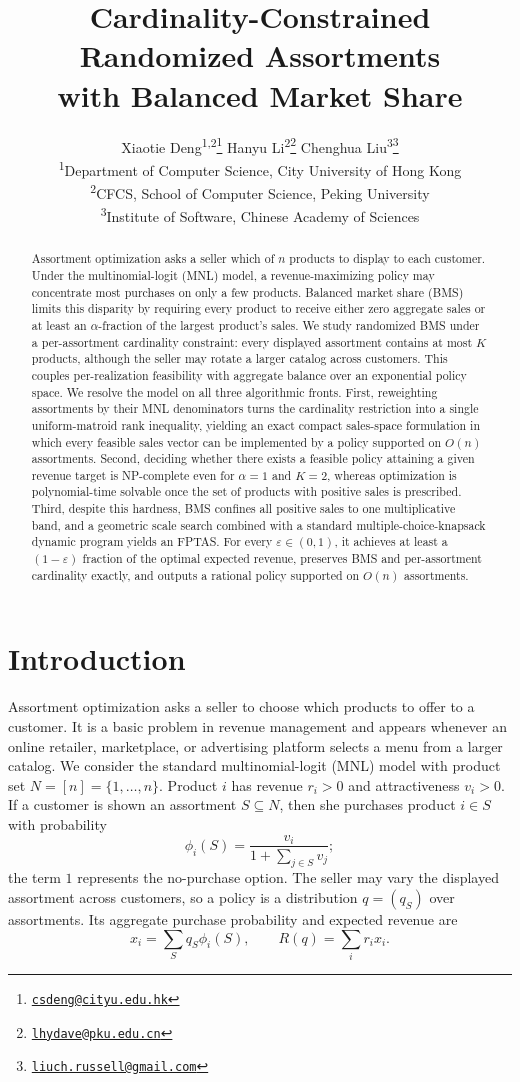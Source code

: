\documentclass[11pt]{article}
\title{Cardinality-Constrained Randomized Assortments\\with Balanced Market Share}
\author{Xiaotie Deng\textsuperscript{1,2}\thanks{\href{mailto:csdeng@cityu.edu.hk}{\texttt{csdeng@cityu.edu.hk}}}\quad
Hanyu Li\textsuperscript{2}\thanks{\href{mailto:lhydave@pku.edu.cn}{\texttt{lhydave@pku.edu.cn}}}\quad
Chenghua Liu\textsuperscript{3}\thanks{\href{mailto:liuch.russell@gmail.com}{\texttt{liuch.russell@gmail.com}}}\\[0.5em]
\textsuperscript{1}Department of Computer Science, City University of Hong Kong\\[-0.1em]
\textsuperscript{2}CFCS, School of Computer Science, Peking University\\[-0.1em]
\textsuperscript{3}Institute of Software, Chinese Academy of Sciences}
\date{}
\begin{document}
\maketitle

\begin{abstract}
Assortment optimization asks a seller which of $n$ products to display to each customer. Under the multinomial-logit (MNL) model, a revenue-maximizing policy may concentrate most purchases on only a few products. Balanced market share (BMS) limits this disparity by requiring every product to receive either zero aggregate sales or at least an $\alpha$-fraction of the largest product's sales. We study randomized BMS under a per-assortment cardinality constraint: every displayed assortment contains at most $K$ products, although the seller may rotate a larger catalog across customers. This couples per-realization feasibility with aggregate balance over an exponential policy space. We resolve the model on all three algorithmic fronts. First, reweighting assortments by their MNL denominators turns the cardinality restriction into a single uniform-matroid rank inequality, yielding an exact compact sales-space formulation in which every feasible sales vector can be implemented by a policy supported on $O(n)$ assortments. Second, deciding whether there exists a feasible policy attaining a given revenue target is NP-complete even for $\alpha=1$ and $K=2$, whereas optimization is polynomial-time solvable once the set of products with positive sales is prescribed. Third, despite this hardness, BMS confines all positive sales to one multiplicative band, and a geometric scale search combined with a standard multiple-choice-knapsack dynamic program yields an FPTAS. For every $\varepsilon\in(0,1)$, it achieves at least a $(1-\varepsilon)$ fraction of the optimal expected revenue, preserves BMS and per-assortment cardinality exactly, and outputs a rational policy supported on $O(n)$ assortments.
\end{abstract}

\section{Introduction}\label{sec:intro}

Assortment optimization asks a seller to choose which products to offer to a customer.  It is a basic problem in revenue management and appears whenever an online retailer, marketplace, or advertising platform selects a menu from a larger catalog.  We consider the standard multinomial-logit (MNL) model with product set $N=[n]=\{1,\ldots,n\}$.  Product $i$ has revenue $r_i>0$ and attractiveness $v_i>0$.  If a customer is shown an assortment $S\subseteq N$, then she purchases product $i\in S$ with probability
\[
 \phi_i(S)=\frac{v_i}{1+\sum_{j\in S}v_j};
\]
the term $1$ represents the no-purchase option.  The seller may vary the displayed assortment across customers, so a policy is a distribution $q=(q_S)$ over assortments.  Its aggregate purchase probability and expected revenue are
\[
 x_i=\sum_Sq_S\phi_i(S),
 \qquad
 R(q)=\sum_i r_ix_i.
\]
\end{document}
